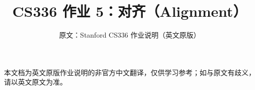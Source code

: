 \documentclass[11pt,a4paper]{ctexart}
\title{\textbf{CS336 作业 5：对齐（Alignment）}}
\author{原文：Stanford CS336 作业说明（英文原版）}
\date{}
\begin{document}
\maketitle
\begin{center}\small
本文档为英文原版作业说明的非官方中文翻译，仅供学习参考；如与原文有歧义，请以英文原文为准。
\end{center}
\tableofcontents
\clearpage



\end{document}
